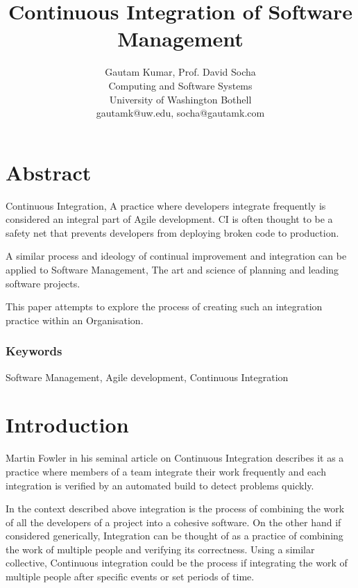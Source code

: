 \documentclass[10pt,conference]{IEEEtran}
\begin{document}
\title{Continuous Integration of Software Management}


\author{
{\rm Gautam Kumar, Prof. David Socha}\\
Computing and Software Systems\\
University of Washington Bothell\\
gautamk@uw.edu, socha@gautamk.com
} %

\maketitle
\thispagestyle{empty}


\section*{Abstract}
Continuous Integration, A practice where developers integrate 
frequently\cite{stahl_modeling_2014} is considered an integral part of Agile 
development. CI is often thought to be a safety net that prevents developers from deploying broken code to production. 

A similar process and ideology of continual improvement and integration can be applied to Software Management, The art and science of planning and leading software projects. \cite{stellman_applied_2005}

This paper attempts to explore the process of creating such an integration practice within an Organisation.

\subsubsection*{Keywords}

Software Management, Agile development, Continuous Integration

\section*{Introduction}

Martin Fowler in his seminal article\cite{fowler_continuous_2006} on Continuous Integration describes it as a practice where members of a team integrate their work frequently and each integration is verified by an automated build to detect problems quickly.

In the context described above integration is the process of combining the work of all the developers of a project into a cohesive software. On the other hand if considered generically, Integration can be thought of as a practice of combining the work of multiple people and verifying its correctness. Using a similar collective, Continuous integration could be the process if integrating the work of multiple people after specific events or set periods of time. 
\end{document}
